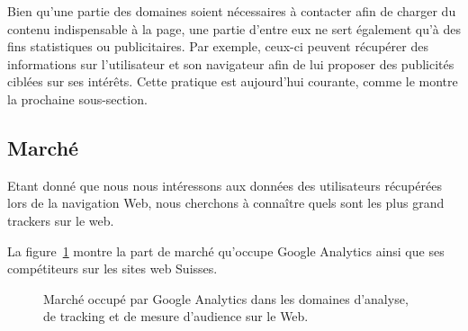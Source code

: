 		Bien qu'une partie des domaines soient nécessaires à contacter afin de charger du contenu indispensable à la page, une partie d'entre eux ne sert également qu'à des fins statistiques ou publicitaires. Par exemple, ceux-ci peuvent récupérer des informations sur l'utilisateur et son navigateur afin de lui proposer des publicités ciblées sur ses intérêts. Cette pratique est aujourd'hui courante, comme le montre la prochaine sous-section.

	\subsection{Marché}

		Etant donné que nous nous intéressons aux données des utilisateurs récupérées lors de la navigation Web, nous cherchons à connaître quels sont les plus grand trackers sur le web.

		La figure~\ref{analytics-usage} montre la part de marché qu'occupe Google Analytics ainsi que ses compétiteurs sur les sites web Suisses.

		\begin{figure}[!h]
			\centering
			\caption{Marché occupé par Google Analytics dans les domaines d'analyse, de tracking et de mesure d'audience sur le Web.}
			\label{analytics-usage}
		\end{figure}

